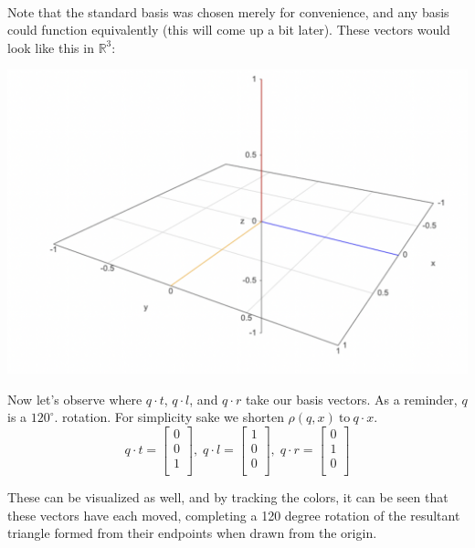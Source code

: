\documentclass[twoside]{article}
\newcommand{\R}{\mathbb{R}}
\begin{document}
\begin{spacing}{1.25}
\paragraph*{}  Note that the standard basis was chosen merely for convenience, 
and any basis could function equivalently (this will come up a bit later). These vectors would look like this in $\R^3$:
\begin{center}
  \includegraphics[scale=0.35]{images/first.png}  
\end{center}
    
Now let's observe where $q \cdot t$, $q\cdot l$, and $q \cdot r$ take our basis vectors. As a 
reminder, $q$ is a ${120}^{\circ}$. rotation. For simplicity sake we shorten 
$\rho(q, x)\: \text{to} \: q \cdot x$.
\[
q \cdot t = 
\begin{bmatrix}
0 \\
0 \\
1 \\
\end{bmatrix}, \;
q \cdot l = 
\begin{bmatrix}
1 \\
0 \\
0 \\
\end{bmatrix}, \;
q \cdot r = 
\begin{bmatrix}
0 \\
1 \\
0 \\
\end{bmatrix}
\]

These can be visualized as well, and by tracking the colors, it can be seen that these vectors have each moved, completing a 120 degree rotation of the resultant triangle formed from their endpoints when drawn from the origin. 


\end{spacing}
\end{document}

